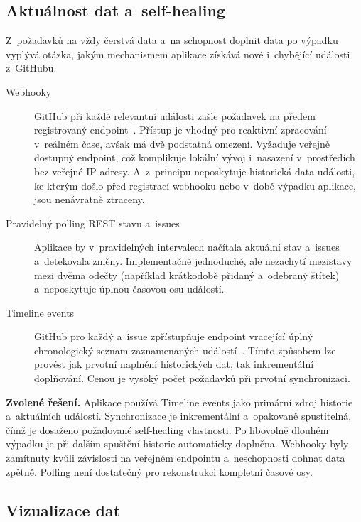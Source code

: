 \subsection{Aktuálnost dat a~self-healing}
\label{subsec:decisions:freshness}

Z~požadavků na vždy čerstvá data a~na schopnost doplnit data po výpadku vyplývá otázka, jakým mechanismem aplikace získává nové i~chybějící události z~GitHubu.

\begin{description}
  \item[Webhooky]
    GitHub při každé relevantní události zašle \HTTP požadavek na předem registrovaný endpoint~\cite{github_webhooks}. Přístup je vhodný pro reaktivní zpracování v~reálném čase, avšak má dvě podstatná omezení. Vyžaduje veřejně dostupný endpoint, což komplikuje lokální vývoj i~nasazení v~prostředích bez veřejné IP adresy. A~z~principu neposkytuje historická data události, ke kterým došlo před registrací webhooku nebo v~době výpadku aplikace, jsou nenávratně ztraceny.

  \item[Pravidelný polling REST \API stavu \PR a~issues]
    Aplikace by v~pravidelných intervalech načítala aktuální stav \PR a~issues a~detekovala změny. Implementačně jednoduché, ale nezachytí mezistavy mezi dvěma odečty (například krátkodobě přidaný a~odebraný štítek) a~neposkytuje úplnou časovou osu událostí.

  \item[Timeline events \API]
    GitHub pro každý \PR a~issue zpřístupňuje endpoint vracející úplný chronologický seznam zaznamenaných událostí~\cite{github_rest_api}. Tímto způsobem lze provést jak prvotní naplnění historických dat, tak inkrementální doplňování. Cenou je vysoký počet \API požadavků při prvotní synchronizaci.
\end{description}

\textbf{Zvolené řešení.} Aplikace používá Timeline events \API jako primární zdroj historie a~aktuálních událostí. Synchronizace je inkrementální a~opakovaně spustitelná, čímž je dosaženo požadované self-healing vlastnosti. Po libovolně dlouhém výpadku je při dalším spuštění historie automaticky doplněna. Webhooky byly zamítnuty kvůli závislosti na veřejném endpointu a~neschopnosti dohnat data zpětně. Polling není dostatečný pro rekonstrukci kompletní časové osy.

\subsection{Vizualizace dat}
\label{sec:design:visualization}

